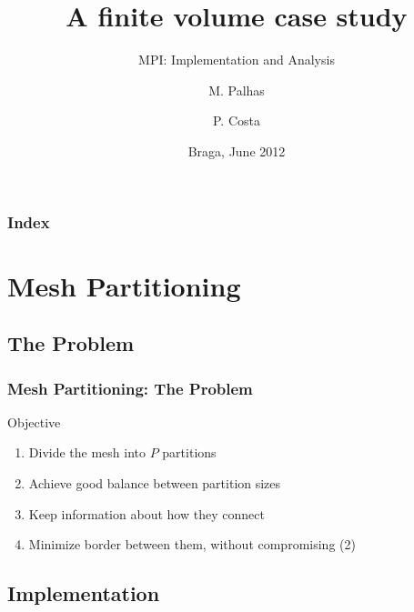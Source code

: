 \documentclass{beamer}
\title{A finite volume case study}
\subtitle{MPI: Implementation and Analysis}
\author{M. Palhas \and P. Costa}
\institute[19808 \and 19830]{
	University of Minho\\
	Department of Informatics
}
\date{Braga, June 2012}
\begin{document}

\begin{frame}[plain]
	\titlepage
\end{frame}

\begin{frame}
	\frametitle{Index}
	\tableofcontents
\end{frame}



%
%
%
%

\section{Mesh Partitioning}

\subsection{The Problem}

\begin{frame}
	\frametitle{Mesh Partitioning: The Problem}

	\begin{block}{Objective}
		\begin{enumerate}\itemsep=10pt
			\item Divide the mesh into $P$ partitions
			\pause
			\item Achieve good balance between partition sizes
			\pause
			\item Keep information about how they connect
			\pause
			\item Minimize border between them, without compromising (2)
		\end{enumerate}
	\end{block}


\end{frame}




%
%
%
%

\subsection{Implementation}
\end{document}
